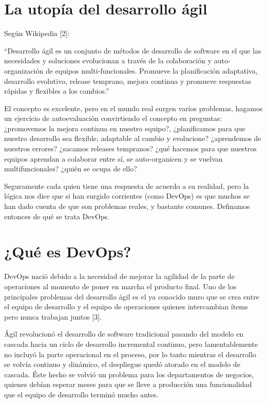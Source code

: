 \documentclass[conference]{IEEEtran}
\begin{document}
\section{La utopía del desarrollo ágil}
Según Wikipedia [2]:

“Desarrollo ágil es un conjunto de métodos de desarrollo de software en el que las necesidades y soluciones evolucionan a través de la colaboración y auto-organización de equipos multi-funcionales. Promueve la planificación adaptativa, desarrollo evolutivo, release temprano, mejora continua y promueve respuestas rápidas y flexibles a los cambios.”

El concepto es excelente, pero en el mundo real surgen varios problemas, hagamos un ejercicio de autoevaluación convirtiendo el concepto en preguntas: ¿promovemos la mejora continua en nuestro equipo?, ¿planificamos para que nuestro desarrollo sea flexible, adaptable al cambio y evolucione? ¿aprendemos de nuestros errores? ¿sacamos releases tempranos? ¿qué hacemos para que nuestros equipos aprendan a colaborar entre sí, se auto-organicen y se vuelvan multifuncionales? ¿quién se ocupa de ello? 

Seguramente cada quien tiene una respuesta de acuerdo a su realidad, pero la lógica nos dice que si han surgido corrientes (como DevOps) es que muchos se han dado cuenta de que son problemas reales, y bastante comunes. Definamos entonces de qué se trata DevOps.

\section{¿Qué es DevOps?}
DevOps nació debido a la necesidad de mejorar la agilidad de la parte de operaciones al momento de poner en marcha el producto final. Uno de los principales problemas del desarrollo ágil es el ya conocido muro que se crea entre el equipo de desarrollo y el equipo de operaciones quienes intercambian ítems pero nunca trabajan juntos [3].

Ágil revolucionó el desarrollo de software tradicional pasando del modelo en cascada hacia un ciclo de desarrollo incremental continuo, pero lamentablemente no incluyó la parte operacional en el proceso, por lo tanto mientras el desarrollo se volvía continuo y dinámico, el despliegue quedó atorado en el modelo de cascada. Éste hecho se volvió un problema para los departamentos de negocios, quienes debían esperar meses para que se lleve a producción una funcionalidad que el equipo de desarrollo terminó mucho antes.
\end{document}
